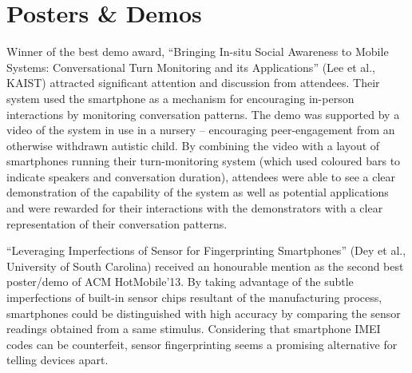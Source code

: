\section{Posters \& Demos}
\label{sec:postersdemos}
Winner of the best demo award, ``Bringing In-situ Social Awareness to Mobile 
Systems: Conversational Turn Monitoring and its Applications'' (Lee et al., 
KAIST) attracted significant attention and discussion from attendees. Their 
system used the smartphone as a mechanism for encouraging in-person interactions
by monitoring conversation patterns. The demo was supported by a video of the 
system in use in a nursery -- encouraging peer-engagement from an otherwise 
withdrawn autistic child. By combining the video with a layout of smartphones 
running their turn-monitoring system (which used coloured bars to indicate 
speakers and conversation duration), attendees were able to see a clear 
demonstration of the capability of the system as well as potential applications
and were rewarded for their interactions with the demonstrators with a clear
representation of their conversation patterns.

``Leveraging Imperfections of Sensor for Fingerprinting Smartphones''
(Dey et al., University of South Carolina) received an honourable mention
as the second best poster/demo of ACM HotMobile'13. By taking advantage of
the subtle imperfections of built-in sensor chips resultant of the
manufacturing process, smartphones could be distinguished with high
accuracy by comparing the sensor readings obtained from a same stimulus.
Considering that smartphone IMEI codes can be counterfeit, sensor
fingerprinting seems a promising alternative for telling devices apart.



